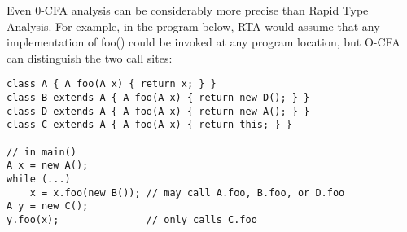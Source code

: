 \documentclass[11pt]{article}
\begin{document}
Even 0-CFA analysis can be considerably more precise than Rapid Type Analysis.  For example, in the program below, RTA would assume that any implementation of foo() could be invoked at any program location, but O-CFA can distinguish the two call sites:

\begin{lstlisting}
class A { A foo(A x) { return x; } }
class B extends A { A foo(A x) { return new D(); } }
class D extends A { A foo(A x) { return new A(); } }
class C extends A { A foo(A x) { return this; } }

// in main()
A x = new A();
while (...)
    x = x.foo(new B()); // may call A.foo, B.foo, or D.foo
A y = new C();
y.foo(x);               // only calls C.foo
\end{lstlisting}
\end{document}
